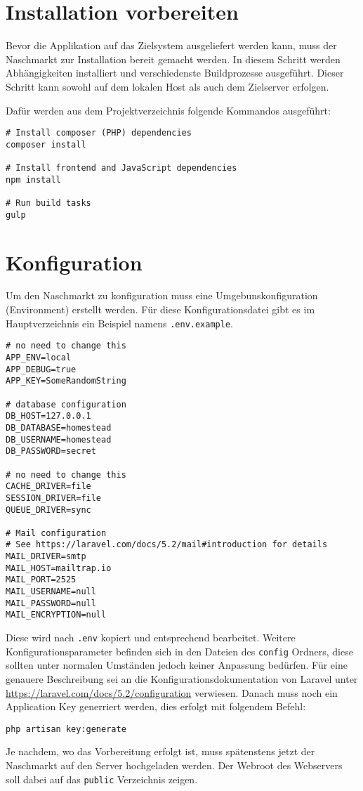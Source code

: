 \section{Installation vorbereiten}
Bevor die Applikation auf das Zielsystem ausgeliefert werden kann, muss der Naschmarkt zur Installation bereit gemacht werden.
In diesem Schritt werden Abh\"angigkeiten installiert und verschiedenste Buildprozesse ausgef\"uhrt.
Dieser Schritt kann sowohl auf dem lokalen Host als auch dem Zielserver erfolgen.

Daf\"ur werden aus dem Projektverzeichnis folgende Kommandos ausgef\"uhrt:
\begin{lstlisting}[caption=Installationsvorbereitung]
# Install composer (PHP) dependencies
composer install

# Install frontend and JavaScript dependencies
npm install

# Run build tasks
gulp
\end{lstlisting}

\section{Konfiguration}
Um den Naschmarkt zu konfiguration muss eine Umgebunskonfiguration (Environment) erstellt werden.
F\"ur diese Konfigurationsdatei gibt es im Hauptverzeichnis ein Beispiel namens \texttt{.env.example}.

\begin{lstlisting}[caption=Beispielenvironment]
# no need to change this
APP_ENV=local
APP_DEBUG=true
APP_KEY=SomeRandomString

# database configuration
DB_HOST=127.0.0.1
DB_DATABASE=homestead
DB_USERNAME=homestead
DB_PASSWORD=secret

# no need to change this
CACHE_DRIVER=file
SESSION_DRIVER=file
QUEUE_DRIVER=sync

# Mail configuration
# See https://laravel.com/docs/5.2/mail#introduction for details
MAIL_DRIVER=smtp
MAIL_HOST=mailtrap.io
MAIL_PORT=2525
MAIL_USERNAME=null
MAIL_PASSWORD=null
MAIL_ENCRYPTION=null
\end{lstlisting}
Diese wird nach \texttt{.env} kopiert und entsprechend bearbeitet.
Weitere Konfigurationsparameter befinden sich in den Dateien des \texttt{config} Ordners, diese sollten unter normalen Umst\"anden jedoch keiner Anpassung bed\"urfen.
F\"ur eine genauere Beschreibung sei an die Konfigurationsdokumentation von Laravel unter \url{https://laravel.com/docs/5.2/configuration} verwiesen.
Danach muss noch ein Application Key generriert werden, dies erfolgt mit folgendem Befehl:

\begin{lstlisting}[caption=Generieren des Applikationsschl\"ussels]
php artisan key:generate
\end{lstlisting}

Je nachdem, wo das Vorbereitung erfolgt ist, muss sp\"atenstens jetzt der Naschmarkt auf den Server hochgeladen werden.
Der Webroot des Webservers soll dabei auf das \texttt{public} Verzeichnis zeigen.
